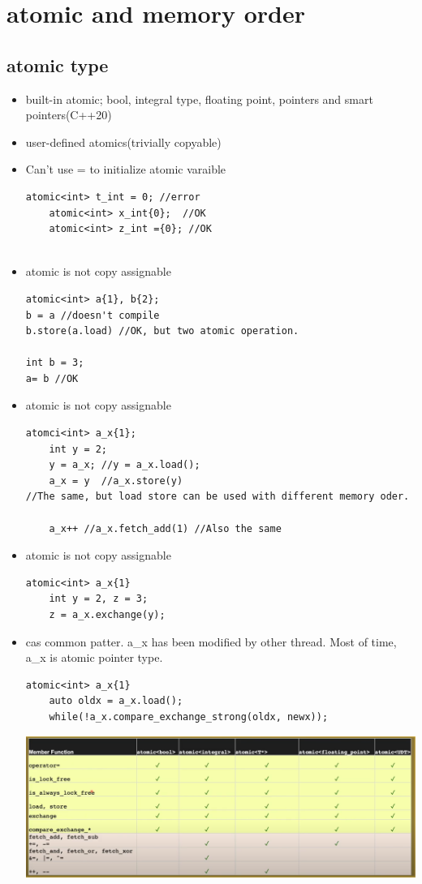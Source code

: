 \documentclass[a4paper,11pt,twoside]{book}
\begin{document}
\section{atomic and memory order}
\subsection{atomic type}
\begin{itemize}
	\item built-in atomic; bool, integral type, floating point, pointers and smart pointers(C++20)
	\item user-defined atomics(trivially copyable)
	\item Can't use = to initialize atomic varaible
\begin{lstlisting}[numbers=none]
	atomic<int> t_int = 0; //error
	atomic<int> x_int{0};  //OK
	atomic<int> z_int ={0}; //OK
	
\end{lstlisting}	
	\item atomic is not copy assignable
\begin{lstlisting}[numbers=none]
atomic<int> a{1}, b{2};
b = a //doesn't compile
b.store(a.load) //OK, but two atomic operation.

int b = 3;
a= b //OK	
\end{lstlisting}	

	\item atomic is not copy assignable
\begin{lstlisting}[numbers=none]
	atomci<int> a_x{1};
	int y = 2;
	y = a_x; //y = a_x.load();
	a_x = y  //a_x.store(y) 
//The same, but load store can be used with different memory oder.

	a_x++ //a_x.fetch_add(1) //Also the same
\end{lstlisting}	

	\item atomic is not copy assignable
\begin{lstlisting}[numbers=none]
	atomic<int> a_x{1}
	int y = 2, z = 3;
	z = a_x.exchange(y);
\end{lstlisting}

	\item cas common patter. a\_x has been modified by other thread. Most of time, a\_x is atomic pointer type.
\begin{lstlisting}[numbers=none]
	atomic<int> a_x{1}
	auto oldx = a_x.load();
	while(!a_x.compare_exchange_strong(oldx, newx));
\end{lstlisting}

\begin{center}
	\includegraphics[width=0.85\linewidth]{pics/atomic_operator.png}
\end{center}

	

\end{itemize}
\end{document}
